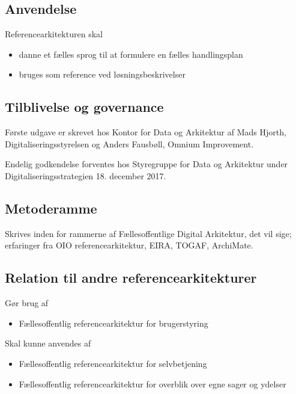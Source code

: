 \subsection{Anvendelse}\label{anvendelse}

Referencearkitekturen skal

\begin{itemize}
\tightlist
\item
  danne et fælles sprog til at formulere en fælles handlingsplan
\item
  bruges som reference ved løsningsbeskrivelser
\end{itemize}

\subsection{Tilblivelse og governance}\label{tilblivelse-og-governance}

Første udgave er skrevet hos Kontor for Data og Arkitektur af Mads
Hjorth, Digitaliseringsstyrelsen og Anders Fausbøll, Omnium Improvement.

Endelig godkendelse forventes hos Styregruppe for Data og Arkitektur
under Digitaliseringsstrategien 18. december 2017.

\subsection{Metoderamme}\label{metoderamme}

Skrives inden for rammerne af Fællesoffentlige Digital Arkitektur, det
vil sige; erfaringer fra OIO referencearkitektur, EIRA, TOGAF,
ArchiMate.

\subsection{Relation til andre
referencearkitekturer}\label{relation-til-andre-referencearkitekturer}

Gør brug af

\begin{itemize}
\tightlist
\item
  Fællesoffentlig referencearkitektur for brugerstyring
\end{itemize}

Skal kunne anvendes af

\begin{itemize}
\tightlist
\item
  Fællesoffentlig referencearkitektur for selvbetjening
\item
  Fællesoffentlig referencearkitektur for overblik over egne sager og
  ydelser
\end{itemize}

